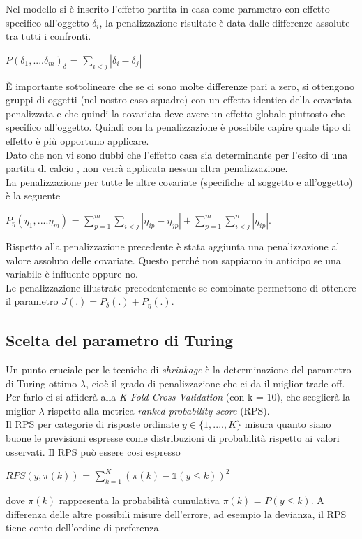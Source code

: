 Nel modello si è inserito l'effetto partita in casa come parametro con effetto specifico all'oggetto $\delta_i$, la penalizzazione risultate è data dalle differenze assolute tra tutti i confronti.

\begin{center}
	$ P(\delta_1,....\delta_m)_{\delta}$ = $\sum_{i<j}|\delta_i - \delta_j|$ 
\end{center}

È importante sottolineare che se ci sono molte differenze pari a zero, si ottengono gruppi di oggetti (nel nostro caso squadre) con un effetto identico della covariata penalizzata e che quindi la covariata deve avere un effetto globale piuttosto che specifico all'oggetto. Quindi con la penalizzazione è possibile capire quale tipo di effetto è più opportuno applicare.\\
Dato che non vi sono dubbi che l'effetto casa sia determinante per l'esito di una partita di calcio \autocite{lago2016home}, non verrà applicata nessun altra penalizzazione.\\
La penalizzazione per tutte le altre covariate (specifiche al soggetto e all'oggetto) è la seguente 
\begin{center}
	$ P_{\eta}(\eta_1,....\eta_m)$ = $\sum^{m}_{p=1}\sum_{i<j}|\eta_{ip} - \eta_{jp}| + \sum^{m}_{p=1}\sum^{n}_{i<j}|\eta_{ip}|$.
\end{center}

Rispetto alla penalizzazione precedente è stata aggiunta una penalizzazione al valore assoluto delle covariate. Questo perché non sappiamo in anticipo se una variabile è influente oppure no.\\

Le penalizzazione illustrate precedentemente se combinate permettono di ottenere il parametro $J(.) = P_\delta(.) + P_\eta(.)$.
\subsection{Scelta del parametro di Turing}
Un punto cruciale per le tecniche di \emph{shrinkage} è la determinazione del parametro di Turing ottimo $\lambda$, cioè il grado di penalizzazione che ci da il miglior trade-off. Per farlo ci si affiderà alla \emph{K-Fold Cross-Validation} (con k = 10), che sceglierà la miglior $\lambda$ rispetto alla metrica \emph{ranked probability score} (RPS).\\
Il RPS \autocite{gneiting2007strictly} per categorie di risposte ordinate $y \in \{1,....,K\}$  misura quanto siano buone le previsioni espresse come distribuzioni di probabilità rispetto ai valori osservati.
Il RPS può essere cosi espresso 
\begin{center}
	$ RPS(y,\pi(k))$ = $\sum^{K}_{k = 1}(\pi(k) -  \mathds{1} (y \le k))^2$ 
\end{center}
dove $\pi(k)$ rappresenta la probabilità cumulativa $\pi(k)$ = $P(y \le k)$. A differenza delle altre possibili misure dell'errore, ad esempio la devianza, il RPS tiene conto dell'ordine di preferenza.
$\mathbb{}$



